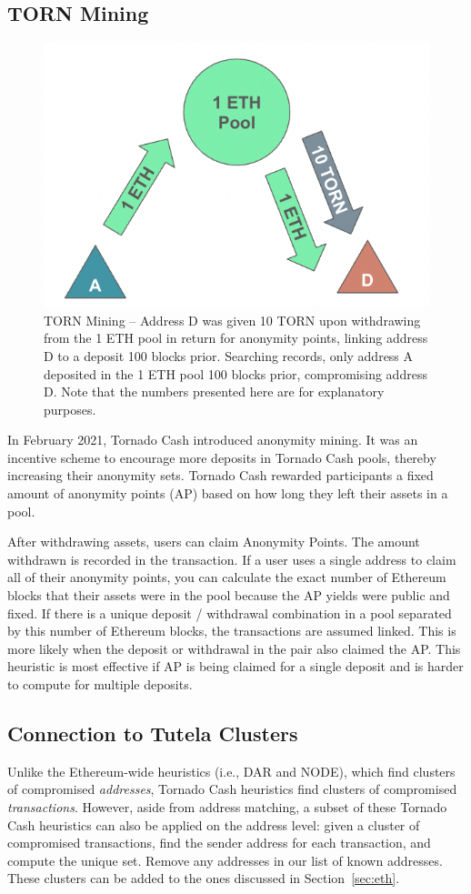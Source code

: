 \subsection{TORN Mining}

\begin{figure}[h!]
\centering
\includegraphics[width=0.6\linewidth]{figures/tcash/h5.png}
\caption{TORN Mining -- Address D was given 10 TORN upon withdrawing from the 1 ETH pool in return for anonymity points, linking address D to a deposit 100 blocks prior. Searching  records, only address A deposited in the 1 ETH pool 100 blocks prior, compromising address D. Note that the numbers presented here are for explanatory purposes.}
\label{fig:tornado}
\end{figure}

In February 2021, Tornado Cash introduced anonymity mining. It was an incentive scheme to encourage more deposits in Tornado Cash pools, thereby increasing their anonymity sets. Tornado Cash rewarded participants a fixed amount of anonymity points (AP) based on how long they left their assets in a pool.

After withdrawing assets, users can claim Anonymity Points. The amount withdrawn is recorded in the transaction. If a user uses a single address to claim all of their anonymity points, you can calculate the exact number of Ethereum blocks that their assets were in the pool because the AP yields were public and fixed. If there is a unique deposit / withdrawal combination in a pool separated by this number of Ethereum blocks, the transactions are assumed linked. This is more likely when the deposit or withdrawal in the pair also claimed the AP. This heuristic is most effective if AP is being claimed for a single deposit and is harder to compute for multiple deposits. 

\subsection{Connection to Tutela Clusters}

Unlike the Ethereum-wide heuristics (i.e., DAR and NODE), which find clusters of compromised \textit{addresses}, Tornado Cash heuristics find clusters of compromised \textit{transactions}. However, aside from address matching, a subset of these Tornado Cash heuristics can also be applied on the address level: given a cluster of compromised transactions, find the sender address for each transaction, and compute the unique set. Remove any addresses in our list of known addresses. These clusters can be added to the ones discussed in Section~\ref{sec:eth}.